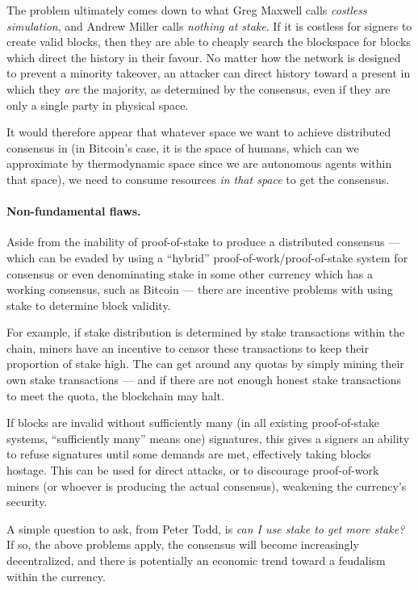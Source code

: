 \documentclass[letterpaper]{article}
\begin{document}
The problem ultimately comes down to what Greg Maxwell calls \emph{costless
simulation}, and Andrew Miller calls \emph{nothing at stake}. If it is costless
for signers to create valid blocks, then they are able to cheaply search the
blockspace for blocks which direct the history in their favour. No matter how
the network is designed to prevent a minority takeover, an attacker can direct
history toward a present in which they \emph{are} the majority, as determined
by the consensus, even if they are only a single party in physical space.

It would therefore appear that whatever space we want to achieve distributed
consensus in (in Bitcoin's case, it is the space of humans, which can we approximate
by thermodynamic space since we are autonomous agents within that space), we
need to consume resources \emph{in that space} to get the consensus.

\paragraph{Non-fundamental flaws.} Aside from the inability of proof-of-stake
to produce a distributed consensus --- which can be evaded by using a ``hybrid''
proof-of-work/proof-of-stake system for consensus or even denominating stake
in some other currency which has a working consensus, such as Bitcoin --- there
are incentive problems with using stake to determine block validity.

For example, if stake distribution is determined by stake transactions within
the chain, miners have an incentive to censor these transactions to keep their
proportion of stake high. The can get around any quotas by simply mining their
own stake transactions --- and if there are not enough honest stake transactions
to meet the quota, the blockchain may halt.

If blocks are invalid without sufficiently many (in all existing proof-of-stake
systems, ``sufficiently many'' means one) signatures, this gives a signers an
ability to refuse signatures until some demands are met, effectively taking
blocks hostage. This can be used for direct attacks, or to discourage proof-of-work
miners (or whoever is producing the actual consensus), weakening the currency's
security.

A simple question to ask, from Peter Todd, is \emph{can I use stake to get more
stake?} If so, the above problems apply, the consensus will become increasingly
decentralized, and there is potentially an economic trend toward a feudalism
within the currency.
\end{document}
